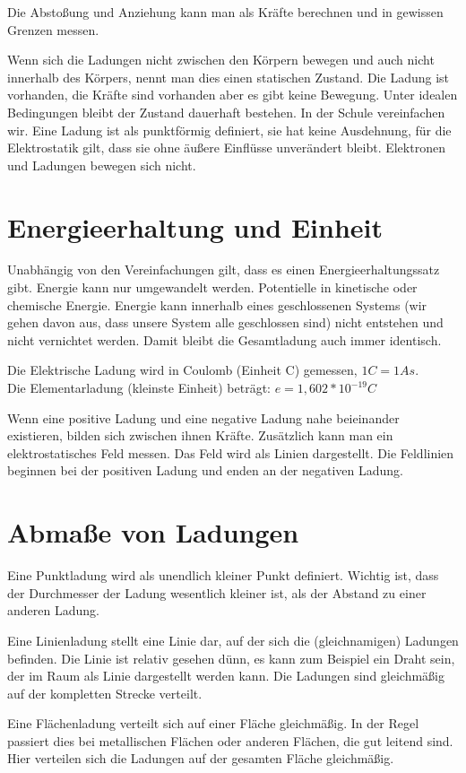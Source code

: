 \documentclass[aspectratio=169, ignorenonframetext]{beamer}
\begin{document}
Die Abstoßung und Anziehung kann man als Kräfte berechnen und in gewissen Grenzen messen.

Wenn sich die Ladungen nicht zwischen den Körpern bewegen und auch nicht innerhalb des Körpers, nennt man dies einen statischen Zustand. Die Ladung ist vorhanden, die Kräfte sind vorhanden aber es gibt keine Bewegung. Unter idealen Bedingungen bleibt der Zustand dauerhaft bestehen. In der Schule vereinfachen wir. Eine Ladung ist als punktförmig definiert, sie hat keine Ausdehnung, für die Elektrostatik gilt, dass sie ohne äußere Einflüsse unverändert bleibt. Elektronen und Ladungen bewegen sich nicht.

\section{Energieerhaltung und Einheit}
Unabhängig von den Vereinfachungen gilt, dass es einen Energieerhaltungssatz gibt. Energie kann nur umgewandelt werden. Potentielle in kinetische oder chemische Energie. Energie kann innerhalb eines geschlossenen Systems (wir gehen davon aus, dass unsere System alle geschlossen sind) nicht entstehen und nicht vernichtet werden. Damit bleibt die Gesamtladung auch immer identisch.

Die Elektrische Ladung wird in Coulomb (Einheit C) gemessen, $1 C = 1 As$. \\ Die Elementarladung (kleinste Einheit) beträgt: $e = 1,602 * 10^{-19} C$

Wenn eine positive Ladung und eine negative Ladung nahe beieinander existieren, bilden sich zwischen ihnen Kräfte. Zusätzlich kann man ein elektrostatisches Feld messen. Das Feld wird als Linien dargestellt. Die Feldlinien beginnen bei der positiven Ladung und enden an der negativen Ladung.

\section{Abmaße von Ladungen}
Eine Punktladung wird als unendlich kleiner Punkt definiert. Wichtig ist, dass der Durchmesser der Ladung wesentlich kleiner ist, als der Abstand zu einer anderen Ladung.

Eine Linienladung stellt eine Linie dar, auf der sich die (gleichnamigen) Ladungen befinden. Die Linie ist relativ gesehen dünn, es kann zum Beispiel ein Draht sein, der im Raum als Linie dargestellt werden kann. Die Ladungen sind gleichmäßig auf der kompletten Strecke verteilt.

Eine Flächenladung verteilt sich auf einer Fläche gleichmäßig. In der Regel passiert dies bei metallischen Flächen oder anderen Flächen, die gut leitend sind. Hier verteilen sich die Ladungen auf der gesamten Fläche gleichmäßig.
\end{document}
